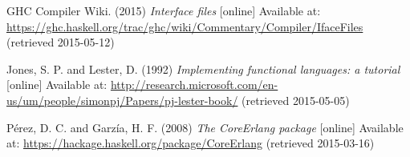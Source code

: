 \begin{thebibliography}{69}
  GHC Compiler Wiki. (2015) \textit{Interface files} [online] Available at: \url{https://ghc.haskell.org/trac/ghc/wiki/Commentary/Compiler/IfaceFiles} (retrieved 2015-05-12)

 Jones, S. P. and Lester, D. (1992) \textit{Implementing functional languages: a tutorial} [online] Available at: \url{http://research.microsoft.com/en-us/um/people/simonpj/Papers/pj-lester-book/} (retrieved 2015-05-05)


 Pérez, D. C. and Garzía, H. F. (2008) \textit{The CoreErlang package} [online] Available at: \url{https://hackage.haskell.org/package/CoreErlang} (retrieved 2015-03-16)

\end{thebibliography}
